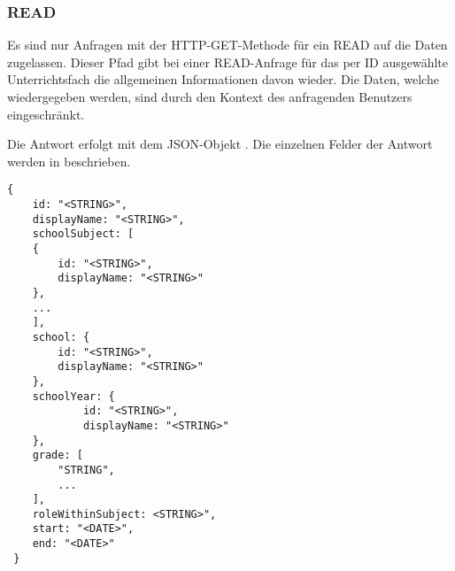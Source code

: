 \subsubsection{READ}
\label{sec:rest:api:subjects:id:read}
Es sind nur Anfragen mit der HTTP-GET-Methode für ein READ auf die Daten zugelassen.
Dieser Pfad gibt bei einer READ-Anfrage für das per ID ausgewählte Unterrichtsfach die allgemeinen Informationen davon wieder.
Die Daten, welche wiedergegeben werden, sind durch den Kontext des anfragenden Benutzers eingeschränkt.

Die Antwort erfolgt mit dem JSON-Objekt . 
Die einzelnen Felder der Antwort werden in  beschrieben.


\begin{lstlisting}[caption={JSON-Antwort für einen GET-Aufruf des Pfads /api/subjects/\$id},label={lst:code:rest:api:subjects:id:read:ret},frame=tlrb]
{
    id: "<STRING>",
    displayName: "<STRING>",
    schoolSubject: [
    {
        id: "<STRING>",
        displayName: "<STRING>"
    },
    ...
    ],
    school: {
        id: "<STRING>",
        displayName: "<STRING>"
    },
    schoolYear: {
            id: "<STRING>",
            displayName: "<STRING>"
    },
    grade: [
        "STRING",
        ...
    ],
    roleWithinSubject: <STRING>",
    start: "<DATE>",
    end: "<DATE>"
 }
\end{lstlisting}

